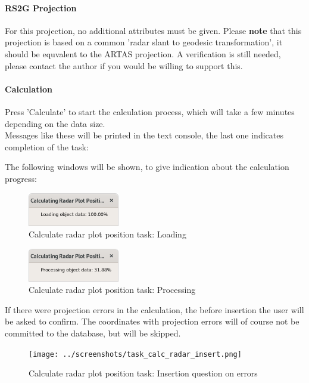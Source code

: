 {\paragraph{RS2G Projection}

For this projection, no additional attributes must be given. Please \textbf{note} that this projection is based on a common 'radar slant to geodesic transformation', it should be equvalent to the ARTAS projection. A verification is still needed, please contact the author if you would be willing to support this.

\paragraph{Calculation}

Press 'Calculate' to start the calculation process, which will take a few minutes depending on the data size. \\

Messages like these will be printed in the text console, the last one indicates completion of the task:

The following windows will be shown, to give indication about the calculation progress:

\begin{figure}[H]
  \center
    \includegraphics[width=4cm,frame]{../screenshots/task_calc_radar_load.png}
  \caption{Calculate radar plot position task: Loading}
\end{figure}

\begin{figure}[H]
  \center
    \includegraphics[width=4cm,frame]{../screenshots/task_calc_radar_process.png}
  \caption{Calculate radar plot position task: Processing}
\end{figure}

If there were projection errors in the calculation, the before insertion the user will be asked to confirm. The coordinates with projection errors will of course not be committed to the database, but will be skipped.

\begin{figure}[H]
  \center
    \texttt{[image: ../screenshots/task\_calc\_radar\_insert.png]}
  \caption{Calculate radar plot position task: Insertion question on errors}
\end{figure}


}

